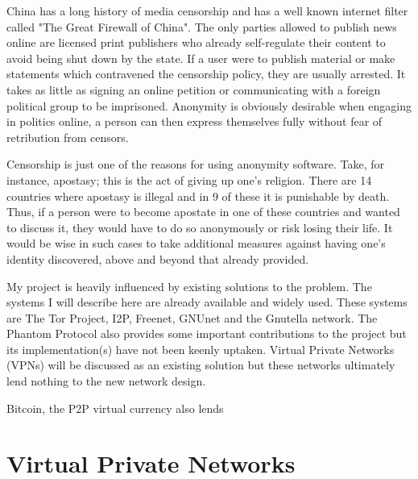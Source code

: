 \documentclass[ %
                    author={Luke Murray},
                supervisor={Dr. Simon Hollis},
                     title={Shadow Peer-to-Peer Networks},
                  subtitle={},
                    degree={MEng},
                      year={2013} ]{thesis}
\begin{document}
China has a long history of media censorship and has a well known internet filter called "The Great Firewall of China". The only parties allowed to publish news online are licensed print publishers who already self-regulate their content to avoid being shut down by the state. If a user were to publish material or make statements which contravened the censorship policy, they are usually arrested. It takes as little as signing an online petition or communicating with a foreign political group to be imprisoned. Anonymity is obviously desirable when engaging in politics online, a person can then express themselves fully without fear of retribution from censors.

Censorship is just one of the reasons for using anonymity software. Take, for instance, apostasy; this is the act of giving up one's religion. There are 14 countries where apostasy is illegal and in 9 of these it is punishable by death. Thus, if a person were to become apostate in one of these countries and wanted to discuss it, they would have to do so anonymously or risk losing their life. It would be wise in such cases to take additional measures against having one's identity discovered, above and beyond that already provided.


My project is heavily influenced by existing solutions to the problem. The systems I will describe here are already available and widely used. These systems are The Tor Project\cite{Tor}, I2P\cite{I2P}, Freenet\cite{Freenet}, GNUnet\cite{GNUnet} and the Gnutella network\cite{Gnutella}. The Phantom Protocol\cite{Phantom} also provides some important contributions to the project but its implementation(s) have not been keenly uptaken. Virtual Private Networks (VPNs) will be discussed as an existing solution but these networks ultimately lend nothing to the new network design. 

Bitcoin, the P2P virtual currency also lends 

\section{Virtual Private Networks}
\end{document}
